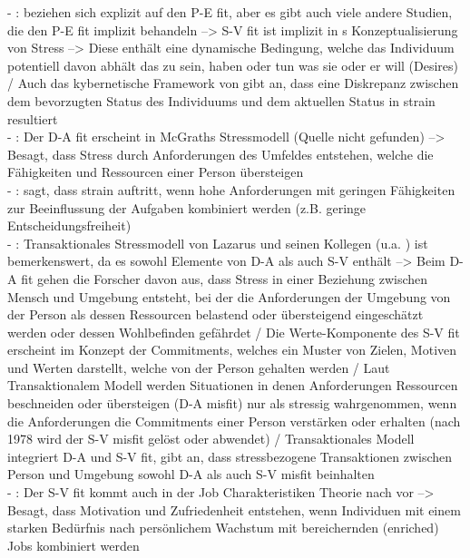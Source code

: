 - \cite[S. 2]{edwards:1990}: \textcite{mechanismsOfJobStressAndStrain:1982} beziehen sich explizit auf den P-E fit, aber es gibt auch viele andere Studien, die den P-E fit implizit behandeln --> S-V fit ist implizit in \textcite{schuler:1980}s Konzeptualisierung von Stress --> Diese enthält eine dynamische Bedingung, welche das Individuum potentiell davon abhält das zu sein, haben oder tun was sie oder er will (Desires) / Auch das kybernetische Framework von \textcite{cummings:1979} gibt an, dass eine Diskrepanz zwischen dem bevorzugten Status des Individuums und dem aktuellen Status in strain resultiert \\
- \cite[S. 2f.]{edwards:1990}: Der D-A fit erscheint in McGraths Stressmodell (Quelle nicht gefunden) --> Besagt, dass Stress durch Anforderungen des Umfeldes entstehen, welche die Fähigkeiten und Ressourcen einer Person übersteigen \\
- \cite[S. 3]{edwards:1990}: \textcite{karasek:1979} sagt, dass strain auftritt, wenn hohe Anforderungen mit geringen Fähigkeiten zur Beeinflussung der Aufgaben kombiniert werden (z.B. geringe Entscheidungsfreiheit) \\
- \cite[S. 3]{edwards:1990}: Transaktionales Stressmodell von Lazarus und seinen Kollegen (u.a. \textcite{lazarus:1978}) ist bemerkenswert, da es sowohl Elemente von D-A als auch S-V enthält --> Beim D-A fit gehen die Forscher davon aus, dass Stress in einer Beziehung zwischen Mensch und Umgebung entsteht, bei der die Anforderungen der Umgebung von der Person als dessen Ressourcen belastend oder übersteigend eingeschätzt werden oder dessen Wohlbefinden gefährdet / Die Werte-Komponente des S-V fit erscheint im Konzept der Commitments, welches ein Muster von Zielen, Motiven und Werten darstellt, welche von der Person gehalten werden / Laut Transaktionalem Modell werden Situationen in denen Anforderungen Ressourcen beschneiden oder übersteigen (D-A misfit) nur als stressig wahrgenommen, wenn die Anforderungen die Commitments einer Person verstärken oder erhalten (nach \textcite{harrison:1978} 1978 wird der S-V misfit gelöst oder abwendet) / Transaktionales Modell integriert D-A und S-V fit, gibt an, dass stressbezogene Transaktionen zwischen Person und Umgebung sowohl D-A als auch S-V misfit beinhalten \\
- \cite[S. 3]{edwards:1990}: Der S-V fit kommt auch in der Job Charakteristiken Theorie nach \textcite{hackmanOldham:1987} vor --> Besagt, dass Motivation und Zufriedenheit entstehen, wenn Individuen mit einem starken Bedürfnis nach persönlichem Wachstum mit bereichernden (enriched) Jobs kombiniert werden \\
